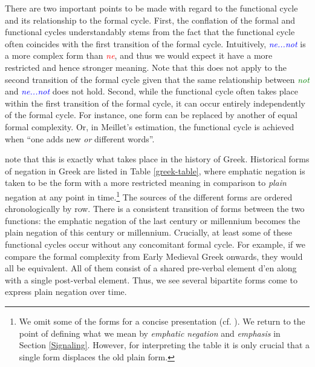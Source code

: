 \documentclass[linguex]{sp}
\theoremstyle{definition} \newtheorem{definition}{Definition}
\begin{document}
There are two important points to be made with regard to the functional cycle and its relationship to the formal cycle. First, the conflation of the formal and functional cycles understandably stems from the fact that the functional cycle often coincides with the first transition of the formal cycle.  Intuitively, \emph{\textcolor{blue}{ne...not}} is a more complex form than  \emph{\textcolor{red}{ne}}, and thus we would expect it have a more restricted and hence stronger meaning. Note that this does not apply to the second transition of the formal cycle given that the same relationship between \emph{\textcolor{green}{not}} and \emph{\textcolor{blue}{ne...not}} does not hold.  Second, while the functional cycle often takes place within the first transition of the formal cycle, it can occur entirely independently of the formal cycle.   For instance, one form can be replaced by another of equal formal complexity.  Or, in Meillet's \citeyearpar[134]{meillet1912} estimation, the functional cycle is achieved when ``one adds  new \emph{or} different words''.  

\cite{kiparsky-condoravdi:2006} note that this is exactly what takes place in the history of Greek. Historical forms of negation in Greek are listed in Table \ref{greek-table}, where emphatic negation is taken to be the form with a more restricted meaning in comparison to \emph{plain} negation at any point in time.\footnote{We omit some of the forms for a concise presentation (cf. \citealt[1]{kiparsky-condoravdi:2006}). We return to the point of defining what we mean by \emph{emphatic negation} and \emph{emphasis} in Section \ref{Signaling}. However, for interpreting the table it is only crucial that a single form displaces the old plain form.} The sources of the different forms are ordered chronologically by row. There is a consistent transition of forms between the two functions: the emphatic negation of the last century or millennium becomes the plain negation of this century or millennium. Crucially, at least some of these functional cycles occur without any concomitant formal cycle.  For example, if we compare the formal complexity from Early Medieval Greek onwards, they would all be equivalent. All of them consist of a shared pre-verbal element \textgreek{d'en} along with a single post-verbal element. Thus, we see several bipartite forms come to express plain negation over time.
\end{document}

